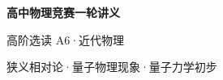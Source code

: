 \documentclass[UTF8,zihao=-4,oneside,openany]{ctexbook}
\begin{document}
\frontmatter
\hypersetup{pageanchor=false}
\begin{titlepage}
 \centering\vspace*{.25\textheight}
 {\Huge\bfseries 高中物理竞赛一轮讲义\par}\vspace{1.2em}
 {\Large 高阶选读 A6·近代物理\par}\vspace{.8em}
 \vfill
 {\color{TextGray}狭义相对论·量子物理现象·量子力学初步\par}
\end{titlepage}
\hypersetup{pageanchor=true}
\tableofcontents
\mainmatter

\end{document}

